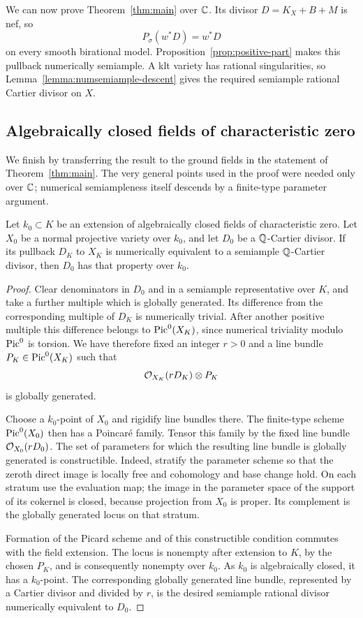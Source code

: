 We can now prove Theorem~\ref{thm:main} over $\mathbb C$.  Its divisor
$D=K_X+B+M$ is nef, so
\[
                         P_\sigma(w^*D)=w^*D
\]
on every smooth birational model.  Proposition~\ref{prop:positive-part}
makes this pullback numerically semiample.  A klt variety has rational
singularities, so Lemma~\ref{lemma:numsemiample-descent} gives the
required semiample rational Cartier divisor on $X$.

\subsection{Algebraically closed fields of characteristic zero}

We finish by transferring the result to the ground fields in the
statement of Theorem~\ref{thm:main}.  The very general points used in
the proof were needed only over $\mathbb C$; numerical semiampleness itself
descends by a finite-type parameter argument.

\begin{lemma}\label{lemma:field-transfer}
Let $k_0\subset K$ be an extension of algebraically closed fields
of characteristic zero.  Let $X_0$ be a normal projective variety
over $k_0$, and let $D_0$ be a $\mathbb Q$-Cartier divisor.  If its pullback
$D_K$ to $X_K$ is numerically equivalent to a semiample
$\mathbb Q$-Cartier divisor, then $D_0$ has that property over $k_0$.
\end{lemma}

\begin{proof}
Clear denominators in $D_0$ and in a semiample representative over
$K$, and take a further multiple which is globally generated.  Its difference
from the corresponding multiple of $D_K$ is numerically trivial.
After another positive multiple this difference belongs to
$\operatorname{Pic}^0(X_K)$, since numerical triviality modulo $\operatorname{Pic}^0$ is
torsion.  We have therefore fixed an integer $r>0$ and a line
bundle $P_K\in\operatorname{Pic}^0(X_K)$ such that
\[
                       \mathcal O_{X_K}(rD_K)\otimes P_K
\]
is globally generated.

Choose a $k_0$-point of $X_0$ and rigidify line bundles there.  The
finite-type scheme $\operatorname{Pic}^0(X_0)$ then has a Poincar\'e family.  Tensor
this family by the fixed line bundle $\mathcal O_{X_0}(rD_0)$.  The set of
parameters for which the resulting line bundle is globally
generated is constructible.  Indeed, stratify the parameter scheme
so that the zeroth direct image is locally free and cohomology and
base change hold.  On each stratum use the evaluation map; the
image in the parameter space of the support of its cokernel is
closed, because projection from $X_0$ is proper.  Its complement
is the globally generated locus on that stratum.

Formation of the Picard scheme and of this constructible condition
commutes with the field extension.  The locus is nonempty after
extension to $K$, by the chosen $P_K$, and is consequently nonempty
over $k_0$.  As $k_0$ is algebraically closed, it has a $k_0$-point.
The corresponding globally generated line bundle, represented by
a Cartier divisor and divided by $r$, is the desired semiample
rational divisor numerically equivalent to $D_0$.
\end{proof}

